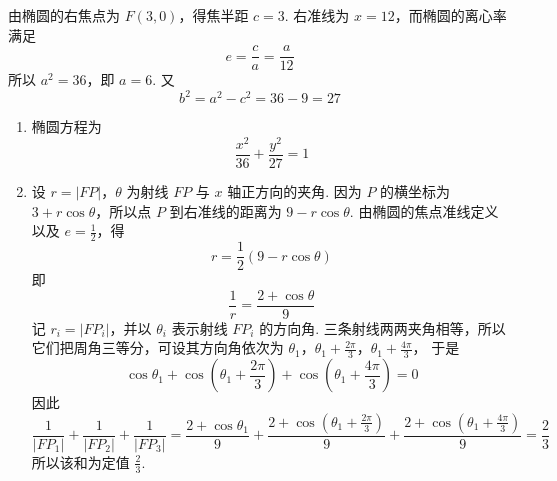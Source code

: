 \begin{solution}
由椭圆的右焦点为 \(F(3,0)\)，得焦半距 \(c=3\). 右准线为 \(x=12\)，而椭圆的离心率满足
\[
e=\frac{c}{a}=\frac{a}{12}
\]
所以 \(a^{2}=36\)，即 \(a=6\). 又
\[
b^{2}=a^{2}-c^{2}=36-9=27
\]
\begin{enumerate}
\item 椭圆方程为
\[
\frac{x^{2}}{36}+\frac{y^{2}}{27}=1
\]
\item 设 \(r=|FP|\)，\(\theta\) 为射线 \(FP\) 与 \(x\) 轴正方向的夹角. 因为 \(P\) 的横坐标为 \(3+r\cos\theta\)，所以点 \(P\) 到右准线的距离为 \(9-r\cos\theta\). 由椭圆的焦点准线定义以及 \(e=\frac{1}{2}\)，得
\[
r=\frac{1}{2}(9-r\cos\theta)
\]
即
\[
\frac{1}{r}=\frac{2+\cos\theta}{9}
\]
记 \(r_i=|FP_i|\)，并以 \(\theta_i\) 表示射线 \(FP_i\) 的方向角. 三条射线两两夹角相等，所以它们把周角三等分，可设其方向角依次为
\(\theta_1\)，\(\theta_1+\frac{2\pi}{3}\)，\(\theta_1+\frac{4\pi}{3}\)，
于是
\[
\cos\theta_1+\cos\left(\theta_1+\frac{2\pi}{3}\right)
+\cos\left(\theta_1+\frac{4\pi}{3}\right)=0
\]
因此
\[
\frac{1}{|FP_1|}+\frac{1}{|FP_2|}+\frac{1}{|FP_3|}
=\frac{2+\cos\theta_1}{9}
+\frac{2+\cos\left(\theta_1+\frac{2\pi}{3}\right)}{9}
+\frac{2+\cos\left(\theta_1+\frac{4\pi}{3}\right)}{9}
=\frac{2}{3}
\]
所以该和为定值 \(\frac{2}{3}\).
\end{enumerate}
\end{solution}
